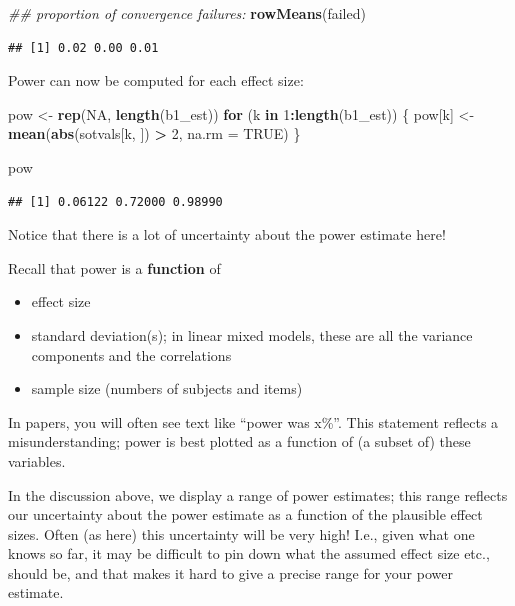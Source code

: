 \documentclass[12pt,]{krantz}
\newenvironment{Shaded}{\begin{snugshade}}{\end{snugshade}}
\newcommand{\CommentTok}[1]{\textcolor[rgb]{0.56,0.35,0.01}{\textit{#1}}}
\newcommand{\ControlFlowTok}[1]{\textcolor[rgb]{0.13,0.29,0.53}{\textbf{#1}}}
\newcommand{\DataTypeTok}[1]{\textcolor[rgb]{0.13,0.29,0.53}{#1}}
\newcommand{\DecValTok}[1]{\textcolor[rgb]{0.00,0.00,0.81}{#1}}
\newcommand{\KeywordTok}[1]{\textcolor[rgb]{0.13,0.29,0.53}{\textbf{#1}}}
\newcommand{\NormalTok}[1]{#1}
\newcommand{\OperatorTok}[1]{\textcolor[rgb]{0.81,0.36,0.00}{\textbf{#1}}}
\newcommand{\OtherTok}[1]{\textcolor[rgb]{0.56,0.35,0.01}{#1}}
\newcommand{\StringTok}[1]{\textcolor[rgb]{0.31,0.60,0.02}{#1}}
\providecommand{\tightlist}{%
  \setlength{\itemsep}{0pt}\setlength{\parskip}{0pt}}
\begin{document}
\begin{Shaded}
\begin{Highlighting}[]
\CommentTok{## proportion of convergence failures:}
\KeywordTok{rowMeans}\NormalTok{(failed)}
\end{Highlighting}
\end{Shaded}

\begin{verbatim}
## [1] 0.02 0.00 0.01
\end{verbatim}

Power can now be computed for each effect size:

\begin{Shaded}
\begin{Highlighting}[]
\NormalTok{pow <-}\StringTok{ }\KeywordTok{rep}\NormalTok{(}\OtherTok{NA}\NormalTok{, }\KeywordTok{length}\NormalTok{(b1_est))}
\ControlFlowTok{for}\NormalTok{ (k }\ControlFlowTok{in} \DecValTok{1}\OperatorTok{:}\KeywordTok{length}\NormalTok{(b1_est)) \{}
\NormalTok{  pow[k] <-}\StringTok{ }\KeywordTok{mean}\NormalTok{(}\KeywordTok{abs}\NormalTok{(sotvals[k, ]) }\OperatorTok{>}\StringTok{ }\DecValTok{2}\NormalTok{, }\DataTypeTok{na.rm =} \OtherTok{TRUE}\NormalTok{)}
\NormalTok{\}}

\NormalTok{pow}
\end{Highlighting}
\end{Shaded}

\begin{verbatim}
## [1] 0.06122 0.72000 0.98990
\end{verbatim}

Notice that there is a lot of uncertainty about the power estimate here!

Recall that power is a \textbf{function} of

\begin{itemize}
\tightlist
\item
  effect size
\item
  standard deviation(s); in linear mixed models, these are all the variance components and the correlations
\item
  sample size (numbers of subjects and items)
\end{itemize}

In papers, you will often see text like ``power was x\%''. This statement reflects a misunderstanding; power is best plotted as a function of (a subset of) these variables.

In the discussion above, we display a range of power estimates; this range reflects our uncertainty about the power estimate as a function of the plausible effect sizes. Often (as here) this uncertainty will be very high! I.e., given what one knows so far, it may be difficult to pin down what the assumed effect size etc., should be, and that makes it hard to give a precise range for your power estimate.
\end{document}

